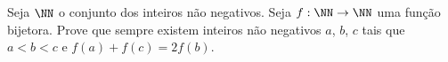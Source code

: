 Seja $\NN$ o conjunto dos inteiros não negativos. Seja $f: \NN \to \NN$ uma função bijetora. Prove que sempre existem inteiros não negativos $a$, $b$, $c$ tais que $a < b < c$ e $f(a)+ f(c) = 2 f(b)$.
